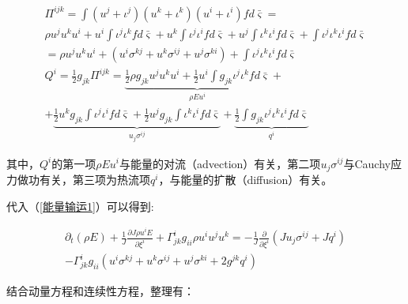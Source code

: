 \documentclass[MathematicsNumericsDerivationsAndOpenFOAM.tex]{subfiles}
\begin{document}
\begin{equation}
  \begin{aligned}
    \Pi^{i j k}= \int ( u^j + \iota^j )(u^k + \iota^k)( u^i+\iota^i) f d \bar{\varsigma} =                                                     \\  \rho  u^j u^k u^i  +  u^i\int \iota^{j} \iota^{k} f  d \bar{\varsigma} +   u^k \int  \iota^{j} \iota^{i} f d \bar{\varsigma}  +  u^j  \int   \iota^{k} \iota^{i} f d \bar{\varsigma} + \int \iota^{j} \iota^{k}  \iota^{i} f  d \bar{\varsigma} \\
    = \rho  u^j u^k u^i  + (u^i \sigma^{kj}+u^k \sigma^{ij}+u^j \sigma^{ki}) + \int \iota^{j} \iota^{k}  \iota^{i} f  d \bar{\varsigma}
    \\
    Q^i=\frac{1}{2} g_{jk}\Pi^{i j k}
    = \underbrace{\frac{1}{2} \rho g_{jk} u^j u^k u^i  + \frac{1}{2} u^i\int g_{jk} \iota^{j} \iota^{k} f  d \bar{\varsigma}}_{\rho  E u^i } + \\
    +  \underbrace{\frac{1}{2} u^k g_{jk}  \int   \iota^{j} \iota^{i} f d \bar{\varsigma}  + \frac{1}{2} u^j g_{jk}  \int   \iota^{k} \iota^{i} f d \bar{\varsigma} }_{ u_j \sigma^{ij}} +  \underbrace{\frac{1}{2}\int g_{jk} \iota^{j} \iota^{k}  \iota^{i} f  d \bar{\varsigma}}_{q^i}
  \end{aligned}
\end{equation}


其中，$Q^i$的第一项$\rho  E u^i$与能量的对流（advection）有关，第二项$u_j \sigma^{ij}$与Cauchy应力做功有关，第三项为热流项$q^i$，与能量的扩散（diffusion）有关。

代入（\ref{能量输运1}）可以得到:


%

\begin{equation}
  \begin{gathered}
    \partial_{t}\left(\rho E\right) + \frac{1}{J}\frac{\partial J \rho u^i E}{\partial  \xi^{i}}+\Gamma^i_{j k}g_{ii}\rho u^{i} u^{j} u^{k}  = - \frac{1}{J} \frac{\partial}{\partial \xi^{i  }}\left( J u_j \sigma^{ij} + J q^i \right)\\
    - \Gamma^i_{j k}g_{ii}(u^i \sigma^{kj}+u^k \sigma^{ij}+u^j \sigma^{ki} + 2g^{jk}q^i)
  \end{gathered}
\end{equation}



%

结合动量方程和连续性方程，整理有：

\end{document}
